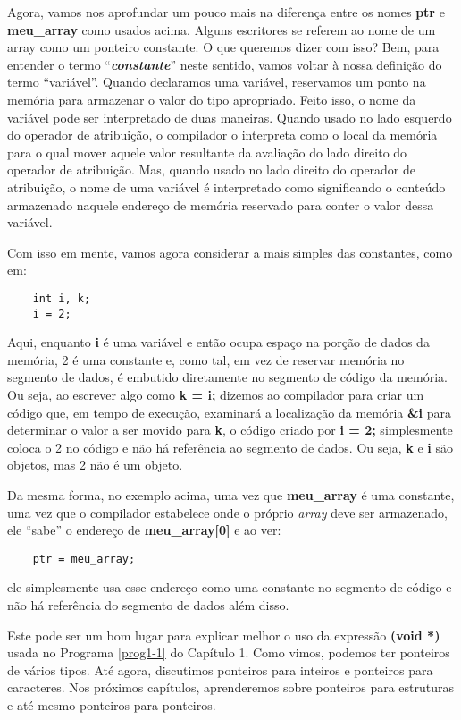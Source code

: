 Agora, vamos nos aprofundar um pouco mais na diferença entre os nomes \textbf{ptr} e \textbf{meu\_array} como usados acima. Alguns escritores se referem ao nome de um array como um ponteiro constante. O que queremos dizer com isso? Bem, para entender o termo ``\textbf{\textit{constante}}'' neste sentido, vamos voltar à nossa definição do termo ``variável''. Quando declaramos uma variável, reservamos um ponto na memória para armazenar o valor do tipo apropriado. Feito isso, o nome da variável pode ser interpretado de duas maneiras. Quando usado no lado esquerdo do operador de atribuição, o compilador o interpreta como o local da memória para o qual mover aquele valor resultante da avaliação do lado direito do operador de atribuição. Mas, quando usado no lado direito do operador de atribuição, o nome de uma variável é interpretado como significando o conteúdo armazenado naquele endereço de memória reservado para conter o valor dessa variável.

Com isso em mente, vamos agora considerar a mais simples das constantes, como em:
\begin{lstlisting}
	int i, k;
	i = 2;
\end{lstlisting}

Aqui, enquanto \textbf{i} é uma variável e então ocupa espaço na porção de dados da memória, 2 é uma constante e, como tal, em vez de reservar memória no segmento de dados, é embutido diretamente no segmento de código da memória. Ou seja, ao escrever algo como \textbf{k = i;} dizemos ao compilador para criar um código que, em tempo de execução, examinará a localização da memória \textbf{\&i} para determinar o valor a ser movido para \textbf{k}, o código criado por \textbf{i = 2;} simplesmente coloca o 2 no código e não há referência ao segmento de dados. Ou seja, \textbf{k} e \textbf{i} são objetos, mas 2 não é um objeto.

Da mesma forma, no exemplo acima, uma vez que \textbf{meu\_array} é uma constante, uma vez que o compilador estabelece onde o próprio \textit{array} deve ser armazenado, ele ``sabe'' o endereço de \textbf{meu\_array[0]} e ao ver:
\begin{lstlisting}
	ptr = meu_array;
\end{lstlisting}
ele simplesmente usa esse endereço como uma constante no segmento de código e não há referência do segmento de dados além disso.

Este pode ser um bom lugar para explicar melhor o uso da expressão \textbf{(void *)} usada no Programa \ref{prog1-1} do Capítulo 1. Como vimos, podemos ter ponteiros de vários tipos. Até agora, discutimos ponteiros para inteiros e ponteiros para caracteres. Nos próximos capítulos, aprenderemos sobre ponteiros para estruturas e até mesmo ponteiros para ponteiros.

